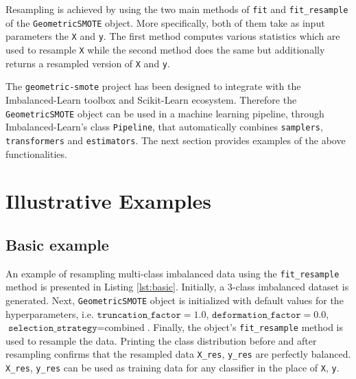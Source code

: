 \documentclass[preprint,12pt, a4paper]{elsarticle}
\begin{document}
Resampling is achieved by using the two main methods of \texttt{fit} and \texttt{fit\_resample} of the \texttt{GeometricSMOTE} object. More specifically, both of them take as input parameters the \texttt{X} and \texttt{y}. The first method computes various statistics which are used to resample \texttt{X} while the second method does the same but additionally returns a resampled version of \texttt{X} and \texttt{y}.

The \texttt{geometric-smote} project has been designed to integrate with the Imbalanced-Learn toolbox and Scikit-Learn ecosystem. Therefore the \texttt{GeometricSMOTE} object can be used in a machine learning pipeline, through Imbalanced-Learn's class \texttt{Pipeline}, that automatically combines \texttt{samplers}, \texttt{transformers} and \texttt{estimators}. The next section provides examples of the above functionalities.

\section{Illustrative Examples}

\subsection{Basic example}

An example of resampling multi-class imbalanced data using the \texttt{fit\_resample} method is presented in Listing \ref{lst:basic}. Initially, 
a 3-class imbalanced dataset is generated. Next, \texttt{GeometricSMOTE} object is initialized with default values for the hyperparameters, i.e. $\texttt{truncation\_factor} = 1.0$, $\texttt{deformation\_factor}=0.0$, $\texttt{selection\_strategy}=\textrm{combined}$. Finally, the object's \texttt{fit\_resample} method is used to resample the data. Printing the class distribution before and after resampling confirms that the resampled data \texttt{X\_res}, \texttt{y\_res} are perfectly balanced. \texttt{X\_res}, \texttt{y\_res} can be used as training data for any classifier in the place of \texttt{X}, \texttt{y}.
\end{document}
